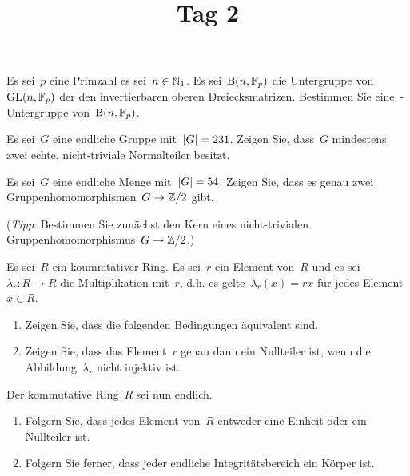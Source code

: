 \documentclass{scrartcl}
\title{Tag 2}
\author{}
\date{}
\begin{document}
\maketitle
\vspace{-6em}

\begin{exercise}
  Es sei~$p$ eine Primzahl es sei~$n \in \mathbb{N}_1$.
  Es sei~$\operatorname{B}(n, \mathbb{F}_p)$ die Untergruppe von~$\operatorname{GL}(n, \mathbb{F}_p)$ der den invertierbaren oberen Dreiecksmatrizen.
  Bestimmen Sie eine~-Untergruppe von~$\operatorname{B}(n, \mathbb{F}_p)$.
\end{exercise}

\begin{exercise}
  Es sei~$G$ eine endliche Gruppe mit~$\lvert G\rvert = 231$.
  Zeigen Sie, dass~$G$ mindestens zwei echte, nicht-triviale Normalteiler besitzt.
\end{exercise}

\begin{exercise}
  Es sei~$G$ eine endliche Menge mit~$\lvert G\rvert = 54$.
  Zeigen Sie, dass es genau zwei Gruppenhomomorphismen~$G \to \Integer/2$ gibt.

  (\emph{Tipp}: Bestimmen Sie zunächst den Kern eines nicht-trivialen Gruppenhomomorphismus~$G \to \Integer/2$.)
\end{exercise}

\begin{exercise}
  Es sei~$R$ ein koummtativer Ring.
  Es sei~$r$ ein Element von~$R$ und es sei~$\lambda_r \colon R \to R$ die Multiplikation mit~$r$, d.h. es gelte~$\lambda_r(x) = rx$ für jedes Element~$x \in R$.
  \begin{enumerate}
    \item
      Zeigen Sie, dass die folgenden Bedingungen äquivalent sind.
    \item
      Zeigen Sie, dass das Element~$r$ genau dann ein Nullteiler ist, wenn die Abbildung~$\lambda_r$ nicht injektiv ist.
  \end{enumerate}
  Der kommutative Ring~$R$ sei nun endlich.
  \begin{enumerate}[resume*]
    \item
      Folgern Sie, dass jedes Element von~$R$ entweder eine Einheit oder ein Nullteiler ist.
    \item
      Folgern Sie ferner, dass jeder endliche Integritätsbereich ein Körper ist.
  \end{enumerate}
\end{exercise}
\end{document}
